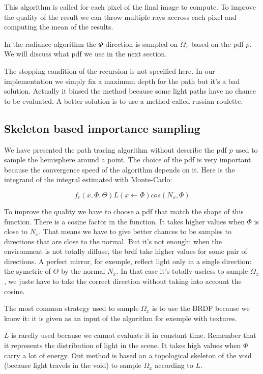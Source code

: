 This algorithm is called for each pixel of the final image to compute. To improve the quality of the result we can throw multiple rays accross each pixel and computing the mean of the results.

In the radiance algorithm the $\Phi$ direction is sampled on $\Omega_x$ based on the pdf $p$. We will discuss what pdf we use in the next section.

The stopping condition of the recursion is not specified here. In our implementation we simply fix a maximum depth for the path but it's a bad solution. Actually it biased the method because some light paths have no chance to be evaluated. A better solution is to use a method called russian roulette.

\subsection{Skeleton based importance sampling}

We have presented the path tracing algorithm without describe the pdf $p$ used to sample the hemisphere around a point. The choice of the pdf is very important because the convergence speed of the algorithm depends on it. Here is the integrand of the integral estimated with Monte-Carlo:

\begin{equation*}
f_r(x, \Phi, \Theta) L(x \leftarrow \Phi) cos(N_x, \Phi)
\end{equation*}

To improve the quality we have to choose a pdf that match the shape of this function. There is a cosine factor in the function. It takes higher values when $\Phi$ is close to $N_x$. That means we have to give better chances to be samples to directions that are close to the normal. But it's not enough: when the environment is not totally diffuse, the brdf take higher values for some pair of directions. A perfect mirror, for exemple, reflect light only in a single direction: the symetric of $\Theta$ by the normal $N_x$. In that case it's totally useless to sample $\Omega_x$, we juste have to take the correct direction without taking into account the cosine.

The most common strategy used to sample $\Omega_x$ is to use the BRDF because we know it: it is given as an input of the algorithm for exemple with textures.

$L$ is rarelly used because we cannot evaluate it in constant time. Remember that it represents the distribution of light in the scene. It takes high values when $\Phi$ carry a lot of energy. Out method is based an a topological skeleton of the void (because light travels in the void) to sample $\Omega_x$ according to $L$.

